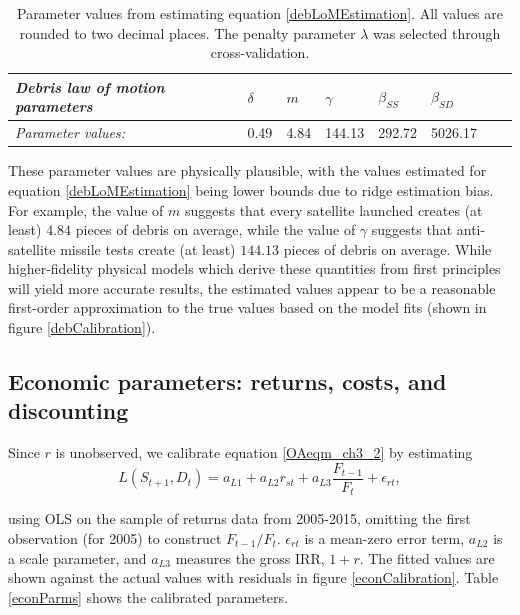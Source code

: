 \documentclass[12pt]{article}
\begin{document}
\begin{table}[H]
	\centering
	\begin{tabular}{|l|l|l|l|l|l|l|l|}
		\hline
		\textit{Debris law of motion parameters} & \textbf{$\delta$} & \textbf{$m$} & \textbf{$\gamma$} & \textbf{$\beta_{SS}$} & \textbf{$\beta_{SD}$} \\ \hline
		\textit{Parameter values:}                           & 0.49                & 4.84         & 144.13              & 292.72                & 5026.17                          \\ \hline
	\end{tabular}
	\caption[Parameter values from estimating equation \ref{debLoMEstimation}]{Parameter values from estimating equation \ref{debLoMEstimation}. All values are rounded to two decimal places. The penalty parameter $\lambda$ was selected through cross-validation.}
	\label{debParms}
\end{table}

These parameter values are physically plausible, with the values estimated for equation \ref{debLoMEstimation} being lower bounds due to ridge estimation bias. For example, the value of $m$ suggests that every satellite launched creates (at least) $4.84$ pieces of debris on average, while the value of $\gamma$ suggests that anti-satellite missile tests create (at least) $144.13$ pieces of debris on average. While higher-fidelity physical models which derive these quantities from first principles will yield more accurate results, the estimated values appear to be a reasonable first-order approximation to the true values based on the model fits (shown in figure \ref{debCalibration}).

\subsection{Economic parameters: returns, costs, and discounting}

Since $r$ is unobserved, we calibrate equation \ref{OAeqm_ch3_2} by estimating
\begin{equation}
\label{empiricalEqn}
L(S_{t+1},D_{t}) = a_{L 1} + a_{L 2} r_{st} + a_{L 3} \frac{F_{t-1}}{F_t} + \epsilon_{r t},
\end{equation}

using OLS on the sample of returns data from 2005-2015, omitting the first observation (for 2005) to construct $F_{t-1}/F_{t}$. $\epsilon_{rt}$ is a mean-zero error term, $a_{L 2}$ is a scale parameter, and $a_{L 3}$ measures the gross IRR, $1+r$. The fitted values are shown against the actual values with residuals in figure \ref{econCalibration}. Table \ref{econParms} shows the calibrated parameters. %
\end{document}

